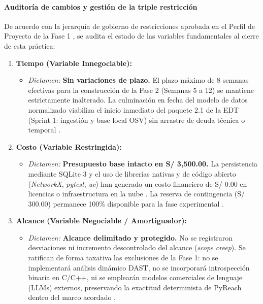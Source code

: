 \paragraph*{Auditoría de cambios y gestión de la triple restricción}
De acuerdo con la jerarquía de gobierno de restricciones aprobada en el Perfil de Proyecto de la Fase 1 \cite{torres2026proyecto}, se audita el estado de las variables fundamentales al cierre de esta práctica:

\begin{enumerate}
    \item \textbf{Tiempo (Variable Innegociable):}
    \begin{itemize}
        \item \textit{Dictamen:} \textbf{Sin variaciones de plazo.} El plazo máximo de 8 semanas efectivas para la construcción de la Fase 2 (Semanas 5 a 12) se mantiene estrictamente inalterado. La culminación en fecha del modelo de datos normalizado viabiliza el inicio inmediato del paquete 2.1 de la EDT (Sprint 1: ingestión y base local OSV) sin arrastre de deuda técnica o temporal \cite{torres2026proyecto}.
    \end{itemize}

    \item \textbf{Costo (Variable Restringida):}
    \begin{itemize}
        \item \textit{Dictamen:} \textbf{Presupuesto base intacto en S/ 3,500.00.} La persistencia mediante SQLite 3 y el uso de librerías nativas y de código abierto (\textit{NetworkX}, \textit{pytest}, \textit{uv}) han generado un costo financiero de S/ 0.00 en licencias o infraestructura en la nube \cite{ladisa2023sok, openssf2023osv}. La reserva de contingencia (S/ 300.00) permanece 100\% disponible para la fase experimental \cite{torres2026proyecto}.
    \end{itemize}

    \item \textbf{Alcance (Variable Negociable / Amortiguador):}
    \begin{itemize}
        \item \textit{Dictamen:} \textbf{Alcance delimitado y protegido.} No se registraron desviaciones ni incremento descontrolado del alcance (\textit{scope creep}). Se ratifican de forma taxativa las exclusiones de la Fase 1: no se implementará análisis dinámico DAST, no se incorporará introspección binaria en C/C++, ni se emplearán modelos comerciales de lenguaje (LLMs) externos, preservando la exactitud determinista de PyReach dentro del marco acordado \cite{bogart2016break, torres2026proyecto}.
    \end{itemize}
\end{enumerate}

